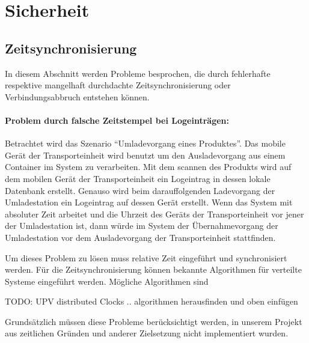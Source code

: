 \section{Sicherheit}

\subsection{Zeitsynchronisierung}

In diesem Abschnitt werden Probleme besprochen, die durch fehlerhafte respektive
mangelhaft durchdachte Zeitsynchronisierung oder Verbindungsabbruch entstehen
können.


\paragraph{Problem durch falsche Zeitstempel bei Logeinträgen:}
Betrachtet wird das Szenario ``Umladevorgang eines Produktes''. Das mobile
Gerät der Transporteinheit wird benutzt um den Ausladevorgang aus einem
Container im System zu verarbeiten. Mit dem scannen des Produkts wird auf dem
mobilen Gerät der Transporteinheit ein Logeintrag in dessen lokale Datenbank
erstellt. Genauso wird beim darauffolgenden Ladevorgang der Umladestation ein
Logeintrag auf dessen Gerät erstellt. Wenn das System mit absoluter Zeit
arbeitet und die Uhrzeit des Geräts der Transporteinheit vor jener der
Umladestation ist, dann würde im System der Übernahmevorgang der Umladestation
vor dem Ausladevorgang der Transporteinheit stattfinden.

Um dieses Problem zu lösen muss relative Zeit eingeführt und synchronisiert
werden. Für die Zeitsynchronisierung können bekannte Algorithmen für verteilte
Systeme eingeführt werden. Mögliche Algorithmen sind
 

TODO: UPV distributed Clocks .. algorithmen herausfinden und oben einfügen 

Grundsätzlich müssen diese Probleme berücksichtigt werden, in unserem Projekt
aus zeitlichen Gründen und anderer Zielsetzung nicht implementiert
wurden.
